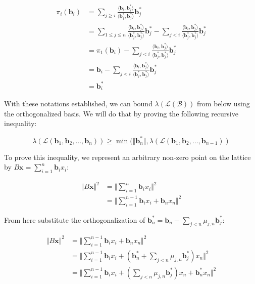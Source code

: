 $$
\begin{aligned}
\pi_i(\mathbf{b}_i) &= \sum_{j\geq i}\frac{\langle \mathbf{b}_i, \mathbf{b}_j^\ast\rangle}{\langle \mathbf{b}_j^\ast, \mathbf{b}_j^\ast \rangle}\mathbf{b}_j^\ast \\
&= \sum_{1 \leq j \leq n}\frac{\langle \mathbf{b}_i, \mathbf{b}_j^\ast\rangle}{\langle \mathbf{b}_j^\ast, \mathbf{b}_j^\ast \rangle}\mathbf{b}_j^\ast  - \sum_{j < i}\frac{\langle \mathbf{b}_i, \mathbf{b}_j^\ast\rangle}{\langle \mathbf{b}_j^\ast, \mathbf{b}_j^\ast \rangle}\mathbf{b}_j^\ast \\
&= \pi_1(\mathbf{b}_i) - \sum_{j < i}\frac{\langle \mathbf{b}_i, \mathbf{b}_j^\ast\rangle}{\langle \mathbf{b}_j^\ast, \mathbf{b}_j^\ast \rangle}\mathbf{b}_j^\ast \\
&= \mathbf{b}_i - \sum_{j < i}\frac{\langle \mathbf{b}_i, \mathbf{b}_j^\ast\rangle}{\langle \mathbf{b}_j^\ast, \mathbf{b}_j^\ast \rangle}\mathbf{b}_j^\ast \\
&= \mathbf{b}_i^\ast
\end{aligned}
$$

With these notations established, we can bound $\lambda(\mathcal{L(B)})$ from below using the orthogonalized basis. We will do that by proving the following recursive inequality:

$$
\lambda(\mathcal{L}(\mathbf{b}_1, \mathbf{b}_2, \ldots, \mathbf{b}_n)) \geq \min (\Vert \mathbf{b}_n^\ast \Vert, \lambda(\mathcal{L}(\mathbf{b}_1, \mathbf{b}_2, \ldots, \mathbf{b}_{n-1}))
$$

To prove this inequality, we represent an arbitrary non-zero point on the lattice by $B\mathbf{x} = \sum_{i=1}^n\mathbf{b}_i x_i$:

$$
\begin{aligned}
\Vert B\mathbf{x} \Vert^2 &= \Vert \sum_{i=1}^n\mathbf{b}_i x_i \Vert^2 \\
&= \Vert \sum_{i=1}^{n-1}\mathbf{b}_ix_i + \mathbf{b}_nx_n \Vert^2
\end{aligned}
$$

From here substitute the orthogonalization of $\mathbf{b}_n^\ast = \mathbf{b}_n - \sum_{j<n}\mu_{j, n} \mathbf{b}_j^\ast$:

$$
\begin{aligned}
\Vert B\mathbf{x} \Vert^2 &= \Vert \sum_{i=1}^{n-1}\mathbf{b}_ix_i + \mathbf{b}_nx_n \Vert^2 \\
&= \Vert \sum_{i=1}^{n-1}\mathbf{b}_ix_i + (\mathbf{b}_n^* + \sum_{j<n}\mu_{j, n}\mathbf{b}_j^\ast)x_n \Vert^2 \\
&= \Vert \sum_{i=1}^{n-1}\mathbf{b}_ix_i + (\sum_{j<n}\mu_{j, n}\mathbf{b}_j^\ast) x_n  + \mathbf{b}_n^\ast x_n\Vert^2
\end{aligned}
$$

